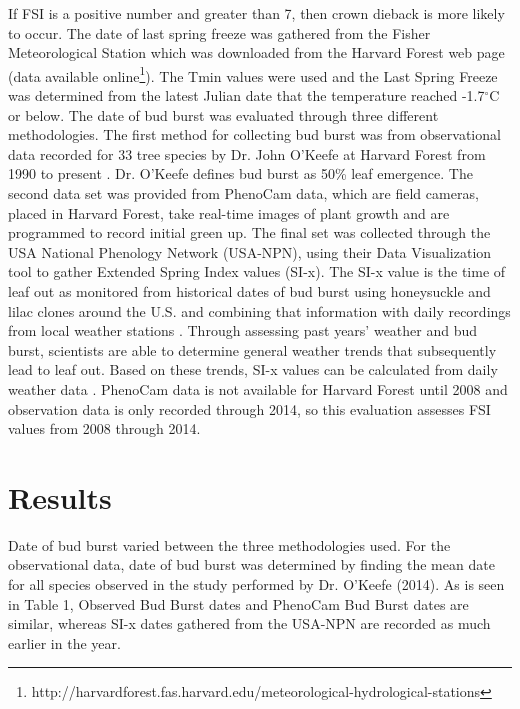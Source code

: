 \documentclass{article}
\begin{document}
If FSI is a positive number and greater than 7, then crown dieback is more likely to occur. The date of last spring freeze was gathered from the Fisher Meteorological Station which was downloaded from the Harvard Forest web page (data available online\footnote{http://harvardforest.fas.harvard.edu/meteorological-hydrological-stations}). The Tmin values were used and the Last Spring Freeze was  determined from the latest Julian date that the temperature reached -1.7$^{\circ}$C or below. The date of bud burst was evaluated through three different methodologies. The first method for collecting bud burst was from observational data recorded for 33 tree species by Dr. John O'Keefe at Harvard Forest from 1990 to present \cite{OKeefe2014}. Dr. O'Keefe defines bud burst as 50\% leaf emergence. The second data set was provided from PhenoCam data, which are field cameras, placed in Harvard Forest, take real-time images of plant growth and are programmed to record initial green up. The final set was collected through the USA National Phenology Network (USA-NPN), using their Data Visualization tool to gather Extended Spring Index values (SI-x). The SI-x value is the time of leaf out as monitored from historical dates of bud burst using honeysuckle and lilac clones around the U.S. and combining that information with daily recordings from local weather stations \cite{USA-NPN2016, Ault2015, Ault2015a, Schwartz2013, Schwartz1997}. Through assessing past years' weather and bud burst, scientists are able to determine general weather trends that subsequently lead to leaf out. Based on these trends, SI-x values can be calculated from daily weather data \cite{USA-NPN2016}. %
\newline
PhenoCam data is not available for Harvard Forest until 2008 and observation data is only recorded through 2014, so this evaluation assesses FSI values from 2008 through 2014. 
\section*{Results}
Date of bud burst varied between the three methodologies used. For the observational data, date of bud burst was determined by finding the mean date for all species observed in the study performed by Dr. O'Keefe (2014). %
As is seen in Table 1, Observed Bud Burst dates and PhenoCam Bud Burst dates are similar, whereas SI-x dates gathered from the USA-NPN are recorded as much earlier in the year.
\end{document}
